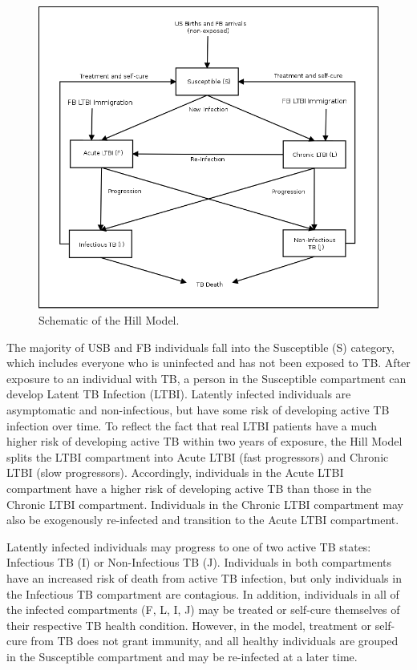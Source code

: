 \documentclass{amsart}
\begin{document}
\begin{figure}[h]
  \begin{center}
    \includegraphics[scale=0.25]{figures/HillModelFlowChart.png}
  \end{center}
  \caption{Schematic of the Hill Model.}
  \label{fig:hillModelSchematic}
\end{figure}

The majority of USB and FB individuals fall into the Susceptible (S) category,
which includes everyone who is uninfected and has not been exposed to TB.  After
exposure to an individual with TB, a person in the Susceptible compartment can
develop Latent TB Infection (LTBI). Latently infected individuals are
asymptomatic and non-infectious, but have some risk of developing active TB
infection over time. To reflect the fact that real LTBI patients have a
much higher risk of developing active TB within two years of exposure, the Hill
Model splits the LTBI compartment into Acute LTBI (fast progressors) and Chronic
LTBI (slow progressors). Accordingly, individuals in the Acute LTBI compartment
have a higher risk of developing active TB than those in the Chronic LTBI
compartment. Individuals in the Chronic LTBI compartment may also be
exogenously re-infected and transition to the Acute LTBI compartment. 

Latently infected individuals may progress to one of two active TB states: Infectious TB (I) or 
Non-Infectious TB (J).  Individuals in both compartments have an increased risk of death from
active TB infection, but only individuals in the Infectious TB compartment are contagious.  
In addition, individuals in all of the infected compartments (F, L, I, J) may be treated or self-cure
themselves of their respective TB health condition.  However, in the model, treatment or self-cure from TB
does not grant immunity, and all healthy individuals are grouped in the Susceptible compartment
and may be re-infected at a later time.\\
\end{document}
